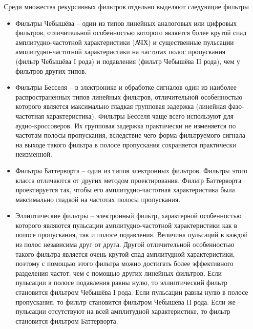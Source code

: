\documentclass[a4paper,12pt]{article}
\begin{document}
Среди множества рекурсивных фильтров отдельно выделяют следующие фильтры
\begin{itemize}
	\item Фильтры Чебышёва -- один из типов линейных аналоговых или цифровых фильтров, отличительной особенностью которого является более крутой спад амплитудно-частотной характеристики (АЧХ) и существенные пульсации амплитудно-частотной характеристики на частотах полос пропускания (фильтр Чебышёва I рода) и подавления (фильтр Чебышёва II рода), чем у фильтров других типов.
	\item Фильтры Бесселя -- в электронике и обработке сигналов один из наиболее распространённых типов линейных фильтров, отличительной особенностью которого является максимально гладкая групповая задержка (линейная фазо-частотная характеристика). Фильтры Бесселя чаще всего используют для аудио-кроссоверов. Их групповая задержка практически не изменяется по частотам полосы пропускания, вследствие чего форма фильтруемого сигнала на выходе такого фильтра в полосе пропускания сохраняется практически неизменной.
	\item Фильтры Баттерворта -- один из типов электронных фильтров. Фильтры этого класса отличаются от других методом проектирования. Фильтр Баттерворта проектируется так, чтобы его амплитудно-частотная характеристика была максимально гладкой на частотах полосы пропускания.
	\item Эллиптические фильтры --  электронный фильтр, характерной особенностью которого являются пульсации амплитудно-частотной характеристики как в полосе пропускания, так и полосе подавления. Величина пульсаций в каждой из полос независима друг от друга. Другой отличительной особенностью такого фильтра является очень крутой спад амплитудной характеристики, поэтому с помощью этого фильтра можно достигать более эффективного разделения частот, чем с помощью других линейных фильтров. Если пульсации в полосе подавления равны нулю, то эллиптический фильтр становится фильтром Чебышёва I рода. Если пульсации равны нулю в полосе пропускания, то фильтр становится фильтром Чебышёва II рода. Если же пульсации отсутствуют на всей амплитудной характеристике, то фильтр становится фильтром Баттерворта.
\end{itemize}
\end{document}

